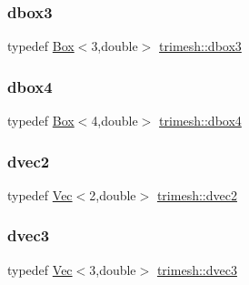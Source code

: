 \mbox{\label{namespacetrimesh_aab916e55b81cb4357797fe5493e14b09}} 
\subsubsection{\texorpdfstring{dbox3}{dbox3}}
{\footnotesize\ttfamily typedef \hyperlink{classtrimesh_1_1Box}{Box}$<$3,double$>$ \hyperlink{namespacetrimesh_aab916e55b81cb4357797fe5493e14b09}{trimesh\+::dbox3}}

\mbox{\label{namespacetrimesh_ae0210243c7c81e889ed86f6e4feeb016}} 
\subsubsection{\texorpdfstring{dbox4}{dbox4}}
{\footnotesize\ttfamily typedef \hyperlink{classtrimesh_1_1Box}{Box}$<$4,double$>$ \hyperlink{namespacetrimesh_ae0210243c7c81e889ed86f6e4feeb016}{trimesh\+::dbox4}}

\mbox{\label{namespacetrimesh_adcb23f5ef0a7e8514f6193b6c9747da7}} 
\subsubsection{\texorpdfstring{dvec2}{dvec2}}
{\footnotesize\ttfamily typedef \hyperlink{classtrimesh_1_1Vec}{Vec}$<$2,double$>$ \hyperlink{namespacetrimesh_adcb23f5ef0a7e8514f6193b6c9747da7}{trimesh\+::dvec2}}

\mbox{\label{namespacetrimesh_a3d3b8c3fb2f53a3b3cbff0a0cd2472a4}} 
\subsubsection{\texorpdfstring{dvec3}{dvec3}}
{\footnotesize\ttfamily typedef \hyperlink{classtrimesh_1_1Vec}{Vec}$<$3,double$>$ \hyperlink{namespacetrimesh_a3d3b8c3fb2f53a3b3cbff0a0cd2472a4}{trimesh\+::dvec3}}

\mbox{\label{namespacetrimesh_a5a6ab9e9336d86643e52af143b283c60}} 
